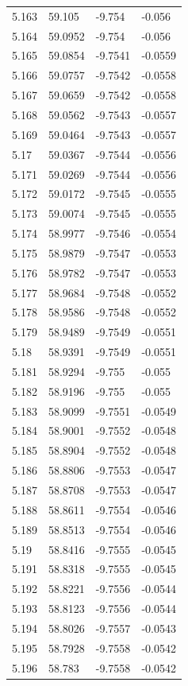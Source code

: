 \begin{tabular}{llll}
5.163 & 59.105 & -9.754 & -0.056 \\
5.164 & 59.0952 & -9.754 & -0.056 \\
5.165 & 59.0854 & -9.7541 & -0.0559 \\
5.166 & 59.0757 & -9.7542 & -0.0558 \\
5.167 & 59.0659 & -9.7542 & -0.0558 \\
5.168 & 59.0562 & -9.7543 & -0.0557 \\
5.169 & 59.0464 & -9.7543 & -0.0557 \\
5.17 & 59.0367 & -9.7544 & -0.0556 \\
5.171 & 59.0269 & -9.7544 & -0.0556 \\
5.172 & 59.0172 & -9.7545 & -0.0555 \\
5.173 & 59.0074 & -9.7545 & -0.0555 \\
5.174 & 58.9977 & -9.7546 & -0.0554 \\
5.175 & 58.9879 & -9.7547 & -0.0553 \\
5.176 & 58.9782 & -9.7547 & -0.0553 \\
5.177 & 58.9684 & -9.7548 & -0.0552 \\
5.178 & 58.9586 & -9.7548 & -0.0552 \\
5.179 & 58.9489 & -9.7549 & -0.0551 \\
5.18 & 58.9391 & -9.7549 & -0.0551 \\
5.181 & 58.9294 & -9.755 & -0.055 \\
5.182 & 58.9196 & -9.755 & -0.055 \\
5.183 & 58.9099 & -9.7551 & -0.0549 \\
5.184 & 58.9001 & -9.7552 & -0.0548 \\
5.185 & 58.8904 & -9.7552 & -0.0548 \\
5.186 & 58.8806 & -9.7553 & -0.0547 \\
5.187 & 58.8708 & -9.7553 & -0.0547 \\
5.188 & 58.8611 & -9.7554 & -0.0546 \\
5.189 & 58.8513 & -9.7554 & -0.0546 \\
5.19 & 58.8416 & -9.7555 & -0.0545 \\
5.191 & 58.8318 & -9.7555 & -0.0545 \\
5.192 & 58.8221 & -9.7556 & -0.0544 \\
5.193 & 58.8123 & -9.7556 & -0.0544 \\
5.194 & 58.8026 & -9.7557 & -0.0543 \\
5.195 & 58.7928 & -9.7558 & -0.0542 \\
5.196 & 58.783 & -9.7558 & -0.0542 \\

\end{tabular}
